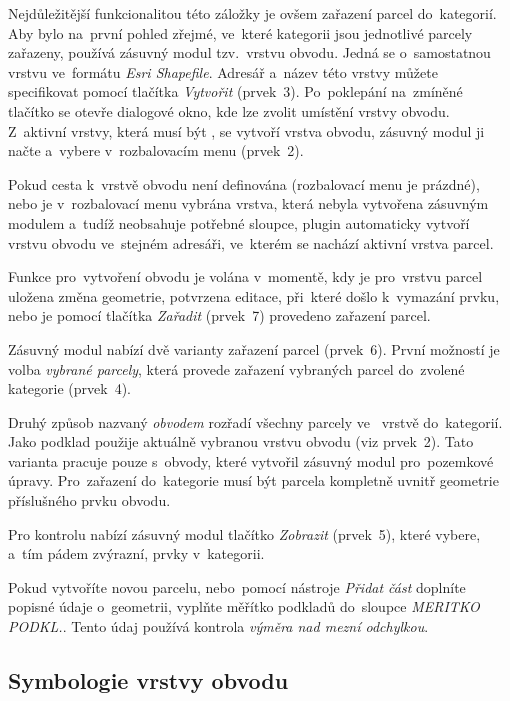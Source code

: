 Nejdůležitější funkcionalitou této záložky je ovšem zařazení parcel
do~kategorií. Aby bylo na~první pohled zřejmé, ve~které kategorii jsou
jednotlivé parcely zařazeny, používá zásuvný modul tzv.~vrstvu
obvodu. Jedná se o~samostatnou vrstvu ve~formátu
\textit{Esri Shapefile}. Adresář a~název této vrstvy můžete specifikovat
pomocí tlačítka \textit{Vytvořit} (prvek~3). Po~poklepání na~zmíněné
tlačítko se otevře dialogové okno, kde lze zvolit umístění vrstvy
obvodu. Z~aktivní vrstvy, která musí být , se vytvoří vrstva
obvodu, zásuvný modul ji načte a~vybere v~rozbalovacím menu (prvek~2).

Pokud cesta k~vrstvě obvodu není definována (rozbalovací menu je
prázdné), nebo je v~rozbalovací menu vybrána vrstva, která nebyla
vytvořena zásuvným modulem a~tudíž neobsahuje potřebné sloupce, plugin
automaticky vytvoří vrstvu obvodu ve~stejném adresáři, ve~kterém se
nachází aktivní vrstva parcel.

Funkce pro~vytvoření obvodu je volána v~momentě, kdy je pro~vrstvu
parcel uložena změna geometrie, potvrzena editace, při~které došlo
k~vymazání prvku, nebo je pomocí tlačítka \textit{Zařadit} (prvek~7)
provedeno zařazení parcel.

Zásuvný modul nabízí dvě varianty zařazení parcel (prvek~6). První
možností je volba \textit{vybrané parcely}, která provede zařazení
vybraných parcel do~zvolené kategorie (prvek~4).

Druhý způsob nazvaný \textit{obvodem} rozřadí všechny parcely
ve~ vrstvě do~ka\-tegorií. Jako podklad použije aktuálně
vybranou vrstvu obvodu (viz prvek~2). Tato varianta pracuje pouze
s~obvody, které vytvořil zásuvný modul pro~pozemkové
úpravy. Pro~zařazení do~kategorie musí být parcela kompletně uvnitř
geometrie příslušného prvku obvodu.

Pro kontrolu nabízí zásuvný modul tlačítko \textit{Zobrazit}
(prvek~5), které vybere, a~tím pádem zvýrazní, prvky v~kategorii.

Pokud vytvoříte novou parcelu, nebo~pomocí nástroje \textit{Přidat
  část} doplníte popis\-né údaje o~geometrii, vyplňte měřítko podkladů
do~sloupce \textit{MERITKO PODKL.}. Tento údaj používá kontrola
\textit{výměra nad mezní odchylkou}.

\subsection{Symbologie vrstvy obvodu}
\label{manual_editace_symbologie}

